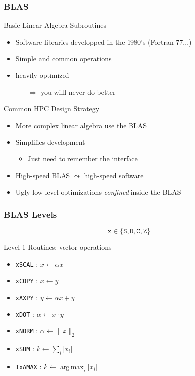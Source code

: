 \documentclass[xcolor={x11names,svgnames},x11names,svgnames]{beamer}
\DeclareMathOperator*{\argmax}{arg\,max}
\newcommand{\red}{\alert}
\begin{document}
\begin{frame}
  \frametitle{BLAS}

  
  \begin{block}{Basic Linear Algebra Subroutines}
    \begin{itemize}
    \item Software libraries developped in the 1980's (Fortran-77...)
    \item \red{Simple} and \red{common} operations
    \item \red{heavily optimized}
      \begin{itemize}
      \item[$\Rightarrow$] you willl never do better
      \end{itemize}
    \end{itemize}
  \end{block}

  \begin{exampleblock}{Common HPC Design Strategy}
    \begin{itemize}
    \item More complex linear algebra use the BLAS
    \item Simplifies development
      \begin{itemize}
      \item Just need to remember the interface
      \end{itemize}
    \item High-speed BLAS $\leadsto$ high-speed software
    \item Ugly low-level optimizations \emph{confined} inside the BLAS
    \end{itemize}
  \end{exampleblock}  
\end{frame}


\begin{frame}
  \frametitle{BLAS Levels}

  \[
    \texttt{x} \in \{ \texttt{S}, \texttt{D}, \texttt{C}, \texttt{Z} \}
  \]
  
  \begin{block}{Level 1 Routines: \red{vector} operations}
    \begin{itemize}
    \item \texttt{xSCAL} : $x \gets \alpha x$
    \item \texttt{xCOPY} : $x \gets y$
    \item \texttt{xAXPY} : $y \gets \alpha x + y$
    \item \texttt{xDOT} : $\alpha \gets x \cdot y$
    \item \texttt{xNORM} : $\alpha \gets \| x \|_2$
    \item \texttt{xSUM} : $k \gets \sum_i | x_i |$
    \item \texttt{IxAMAX} : $k \gets \argmax_i | x_i |$
    \end{itemize}
  \end{block}
\end{frame}
\end{document}

